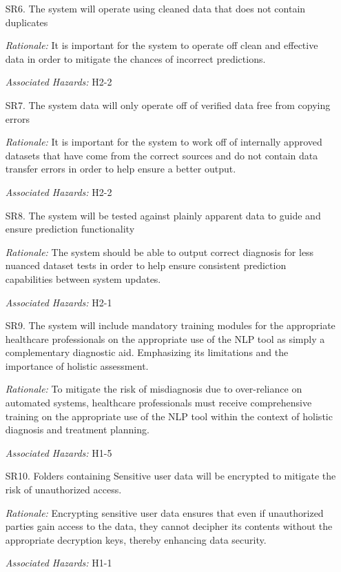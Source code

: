 \documentclass{article}
\begin{document}
\begin{enumerate}
   \item[SR6.] The system will operate using cleaned data that does not contain duplicates
   \item[] \emph{Rationale:} It is important for the system to operate off clean and effective data in order to mitigate the chances of incorrect predictions.
   \item[] \emph{Associated Hazards:} H2-2 \\
 
   \item[SR7.] The system data will only operate off of verified data free from copying errors
   \item[] \emph{Rationale:} It is important for the system to work off of internally approved datasets that have come from the correct sources and do not contain data transfer errors in order to help ensure a better output.
   \item[] \emph{Associated Hazards:} H2-2 \\
   \item[SR8.] The system will be tested against plainly apparent data to guide and ensure prediction functionality
   \item[] \emph{Rationale:} The system should be able to output correct diagnosis for less nuanced dataset tests in order to help ensure consistent prediction capabilities between system updates.
   \item[] \emph{Associated Hazards:} H2-1 \\
   \item[SR9.] The system will include mandatory training modules for the appropriate healthcare professionals on the appropriate use of the NLP tool as simply a complementary diagnostic aid. Emphasizing its limitations and the importance of holistic assessment.
   \item[] \emph{Rationale:} To mitigate the risk of misdiagnosis due to over-reliance on automated systems, healthcare professionals must receive comprehensive training on the appropriate use of the NLP tool within the context of holistic diagnosis and treatment planning.
   \item[] \emph{Associated Hazards:} H1-5\\
  
   \item[SR10.] Folders containing Sensitive user data will be encrypted to mitigate the risk of unauthorized access.
   \item[] \emph{Rationale:} Encrypting sensitive user data ensures that even if unauthorized parties gain access to the data, they cannot decipher its contents without the appropriate decryption keys, thereby enhancing data security.
   \item[] \emph{Associated Hazards:} H1-1\\


\end{enumerate}
\end{document}
